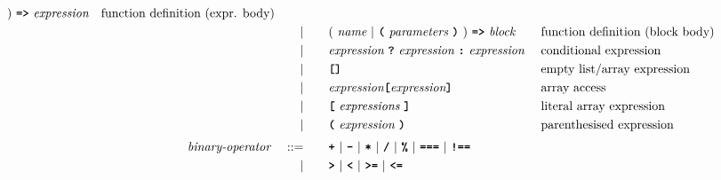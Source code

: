 \begin{alignat*}{9}
                                            )\    
                                            \texttt{\textbf{=>}}\ \textit{expression}
                                                           && \textrm{function definition (expr. body)}\\
&&                       && |   &\quad &&   (\ \textit{name}\ | \
                                               \textbf{\texttt{(}}\ \textit{parameters}\ \textbf{\texttt{)}}\
                                            )\    
                                            \texttt{\textbf{=>}}\ \textit{block}
                                                           && \textrm{function definition (block body)}\\
&&                       && |   &\quad &&   \textit{expression} \ \textbf{\texttt{?}}\ 
                                            \textit{expression}
                                            \ \textbf{\texttt{:}}\
                                            \textit{expression}\
                                                           && \textrm{conditional expression}\\
&&                       && |   &\quad &&   \textbf{\texttt{[]}}
                                                           && \textrm{empty list/array expression}\\
&&                       && |   &\quad && \textit{expression} \textbf{\texttt{[}}
                                          \textit{expression} \textbf{\texttt{]}}
                                                           && \textrm{array access} \\
&&                       && |   &\quad &&   \textbf{\texttt{[}}\ 
                                            \textit{expressions}\
                                            \textbf{\texttt{]}}
                                                           && \textrm{literal array expression}\\
&&                       && |   &\quad &&  \textbf{\texttt{(}}\  \textit{expression} \ 
                                            \textbf{\texttt{)}} && \textrm{parenthesised expression}\\[1mm]
&& \textit{binary-operator}    \ 
                        && ::= &\quad && \textbf{\texttt{+}}\ |\ \textbf{\texttt{-}}\ |\ \textbf{\texttt{*}}\ |\ \textbf{\texttt{/}}\ |\ \textbf{\texttt{\%}}\ |\ 
                                   \textbf{\texttt{===}}\ |\ \textbf{\texttt{!==}}\ \\
&&                       && |  &\quad &&  \texttt{\textbf{>}}\ |\ \texttt{\textbf{<}}\ |\ \texttt{\textbf{>=}}\ |\ \texttt{\textbf{<=}}\

\end{alignat*}

